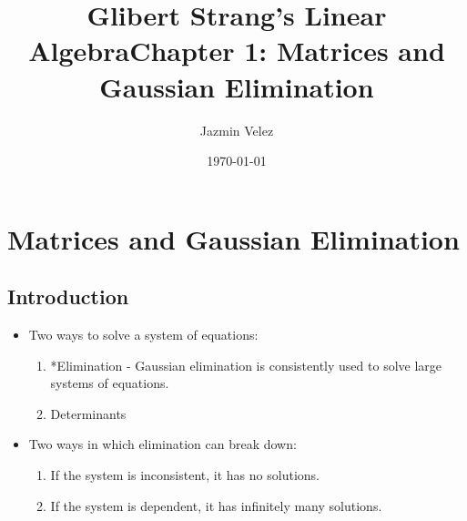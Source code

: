 \documentclass[12pt]{article}
\title{Glibert Strang's Linear Algebra}
\author{Jazmin Velez}
\date{\today}
\begin{document}
\maketitle

\title{Chapter 1: Matrices and Gaussian Elimination}

\section{Matrices and Gaussian Elimination}
\subsection{Introduction}
\begin{itemize}
    \item Two ways to solve a system of equations:
    \begin{enumerate}
        \item *Elimination - Gaussian elimination is consistently used to solve large systems of equations.
        \item Determinants
    \end{enumerate}
    \item Two ways in which elimination can break down:
    \begin{enumerate}
        \item If the system is inconsistent, it has no solutions.
        \item If the system is dependent, it has infinitely many solutions.
    \end{enumerate}
\end{itemize}
\end{document}

